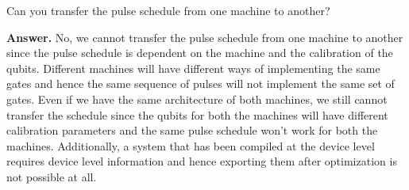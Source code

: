 \tcbline{}

\begin{question}
    Can you transfer the pulse schedule from one machine to another?
\end{question}
\textbf{Answer.} No, we cannot transfer the pulse schedule from one machine to another since the pulse schedule is dependent on the machine and the calibration of the qubits. Different machines will have different ways of implementing the same gates and hence the same sequence of pulses will not implement the same set of gates. Even if we have the same architecture of both machines, we still cannot transfer the schedule since the qubits for both the machines will have different calibration parameters and the same pulse schedule won't work for both the machines. Additionally, a system that has been compiled at the device level requires device level information and hence exporting them after optimization is not possible at all.